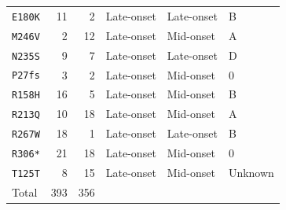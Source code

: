\begin{tabular*}{0.98\textwidth}{@{\extracolsep{\fill}}lrrlll@{}}
\texttt{E180K} & 11 & 2 & Late-onset & Late-onset & B \\
\texttt{M246V} & 2 & 12 & Late-onset & Mid-onset & A \\
\texttt{N235S} & 9 & 7 & Late-onset & Late-onset & D \\
\texttt{P27fs} & 3 & 2 & Late-onset & Mid-onset & 0 \\
\texttt{R158H} & 16 & 5 & Late-onset & Mid-onset & B \\
\texttt{R213Q} & 10 & 18 & Late-onset & Mid-onset & A \\
\texttt{R267W} & 18 & 1 & Late-onset & Late-onset & B \\
\texttt{R306*} & 21 & 18 & Late-onset & Mid-onset & 0 \\
\texttt{T125T} & 8 & 15 & Late-onset & Mid-onset & Unknown \\
\midrule
Total & 393 & 356 & & & \\
\bottomrule
\end{tabular*}
\endgroup
